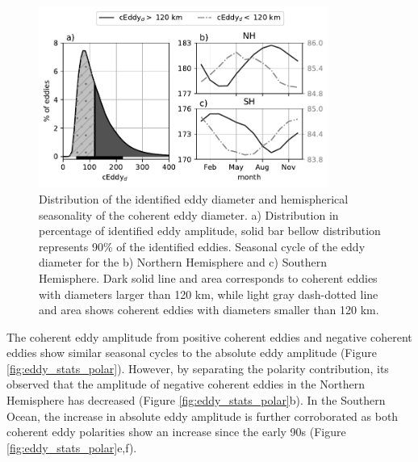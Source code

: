\documentclass[draft,linenumbers]{agujournal2019}
\newcommand{\cEddy}{\textrm{cEddy}}
\providecommand{\DIFadd}[1]{{\protect\color{blue}\uwave{#1}}} %
\providecommand{\DIFaddFL}[1]{\DIFadd{#1}} %
\providecommand{\DIFaddbeginFL}{} %
\providecommand{\DIFaddendFL}{} %
\begin{document}
	\begin{figure}
	    \centering
	    \includegraphics[width=95mm]{figures/eddy_diameter_seasonal.pdf}
	    \caption{Distribution of the identified eddy diameter \DIFaddbeginFL \DIFaddFL{($\cEddy_d$; km) }\DIFaddendFL and hemispherical seasonality of the coherent eddy diameter. a) Distribution in percentage of identified eddy amplitude, solid bar bellow distribution represents 90\% of the identified eddies. Seasonal cycle of the eddy diameter for the b) Northern Hemisphere and c) Southern Hemisphere. Dark solid line and area corresponds to coherent eddies with diameters larger than 120 km, while light gray dash-dotted line and area shows coherent eddies with diameters smaller than 120 km.}
	    \label{fig:eddy_diameter}
	\end{figure}

	The coherent eddy amplitude from positive coherent eddies and negative coherent eddies show similar seasonal cycles to the absolute eddy amplitude (Figure \ref{fig:eddy_stats_polar}).
	However, by separating the polarity contribution, its observed that the amplitude of negative coherent eddies in the Northern Hemisphere has decreased (Figure \ref{fig:eddy_stats_polar}b). 
	In the Southern Ocean, the increase in absolute eddy amplitude is further corroborated as both coherent eddy polarities show an increase since the early 90s (Figure \ref{fig:eddy_stats_polar}e,f).


\end{document}
